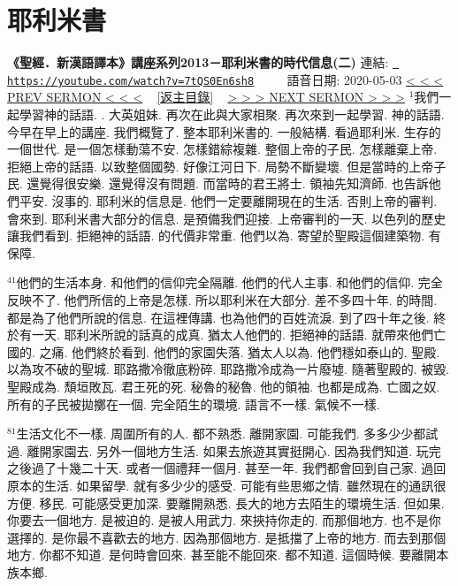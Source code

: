 \documentclass{book}
\begin{document}
\section{耶利米書}
\label{sec:7tQS0En6sh8}
\textbf{《聖經．新漢語譯本》講座系列2013－耶利米書的時代信息(二)}
\newline
\newline
連結: \href{https://youtube.com/watch?v=7tQS0En6sh8}{\texttt{ https://youtube.com/watch?v=7tQS0En6sh8}} ~~~~ 語音日期: 2020-05-03 
\newline
\newline
\hyperref[sec:WEwyO2xJwfc]{\small{< < < PREV SERMON < < <}}
~
\hyperref[sec:index]{\small{[返主目錄]}}
~
\hyperref[sec:VhiGoXEG1RY]{\small{> > > NEXT SERMON > > >}}
\newline
\newline
$^{1}$我們一起學習神的話語.
.
大英姐妹.
再次在此與大家相聚.
再次來到一起學習.
神的話語.
今早在早上的講座.
我們概覽了.
整本耶利米書的.
一般結構.
看過耶利米.
生存的一個世代.
是一個怎樣動蕩不安.
怎樣錯綜複雜.
整個上帝的子民.
怎樣離棄上帝.
拒絕上帝的話語.
以致整個國勢.
好像江河日下.
局勢不斷變壞.
但是當時的上帝子民.
還覺得很安樂.
還覺得沒有問題.
而當時的君王將士.
領袖先知濟師.
也告訴他們平安.
沒事的.
耶利米的信息是.
他們一定要離開現在的生活.
否則上帝的審判.
會來到.
耶利米書大部分的信息.
是預備我們迎接.
上帝審判的一天.
以色列的歷史讓我們看到.
拒絕神的話語.
的代價非常重.
他們以為.
寄望於聖殿這個建築物.
有保障.

$^{41}$他們的生活本身.
和他們的信仰完全隔離.
他們的代人主事.
和他們的信仰.
完全反映不了.
他們所信的上帝是怎樣.
所以耶利米在大部分.
差不多四十年.
的時間.
都是為了他們所說的信息.
在這裡傳講.
也為他們的百姓流淚.
到了四十年之後.
終於有一天.
耶利米所說的話真的成真.
猶太人他們的.
拒絕神的話語.
就帶來他們亡國的.
之痛.
他們終於看到.
他們的家園失落.
猶太人以為.
他們穩如泰山的.
聖殿.
以為攻不破的聖城.
耶路撒冷徹底粉碎.
耶路撒冷成為一片廢墟.
隨著聖殿的.
被毀.
聖殿成為.
頹垣敗瓦.
君王死的死.
秘魯的秘魯.
他的領袖.
也都是成為.
亡國之奴.
所有的子民被拋擲在一個.
完全陌生的環境.
語言不一樣.
氣候不一樣.

$^{81}$生活文化不一樣.
周圍所有的人.
都不熟悉.
離開家園.
可能我們.
多多少少都試過.
離開家園去.
另外一個地方生活.
如果去旅遊其實挺開心.
因為我們知道.
玩完之後過了十幾二十天.
或者一個禮拜一個月.
甚至一年.
我們都會回到自己家.
過回原本的生活.
如果留學.
就有多少少的感受.
可能有些思鄉之情.
雖然現在的通訊很方便.
移民.
可能感受更加深.
要離開熟悉.
長大的地方去陌生的環境生活.
但如果.
你要去一個地方.
是被迫的.
是被人用武力.
來挾持你走的.
而那個地方.
也不是你選擇的.
是你最不喜歡去的地方.
因為那個地方.
是抵擋了上帝的地方.
而去到那個地方.
你都不知道.
是何時會回來.
甚至能不能回來.
都不知道.
這個時候.
要離開本族本鄉.
\end{document}
